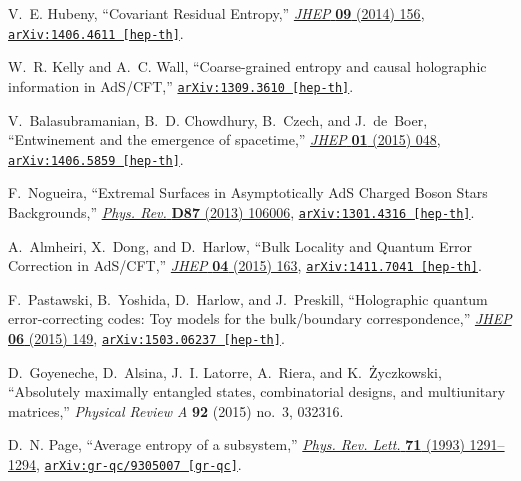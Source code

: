 \begin{thebibliography}{100}
V.~E. Hubeny, ``{Covariant Residual Entropy},''
  \href{http://dx.doi.org/10.1007/JHEP09(2014)156}{{\em JHEP} {\bf 09} (2014)
  156},
\href{http://arxiv.org/abs/1406.4611}{{\tt arXiv:1406.4611 [hep-th]}}.

W.~R. Kelly and A.~C. Wall, ``{Coarse-grained entropy and causal holographic
  information in AdS/CFT},''
\href{http://arxiv.org/abs/1309.3610}{{\tt arXiv:1309.3610 [hep-th]}}.

V.~Balasubramanian, B.~D. Chowdhury, B.~Czech, and J.~de~Boer, ``{Entwinement
  and the emergence of spacetime},''
  \href{http://dx.doi.org/10.1007/JHEP01(2015)048}{{\em JHEP} {\bf 01} (2015)
  048},
\href{http://arxiv.org/abs/1406.5859}{{\tt arXiv:1406.5859 [hep-th]}}.

F.~Nogueira, ``{Extremal Surfaces in Asymptotically AdS Charged Boson Stars
  Backgrounds},'' \href{http://dx.doi.org/10.1103/PhysRevD.87.106006}{{\em
  Phys. Rev.} {\bf D87} (2013)  106006},
\href{http://arxiv.org/abs/1301.4316}{{\tt arXiv:1301.4316 [hep-th]}}.

A.~Almheiri, X.~Dong, and D.~Harlow, ``{Bulk Locality and Quantum Error
  Correction in AdS/CFT},''
  \href{http://dx.doi.org/10.1007/JHEP04(2015)163}{{\em JHEP} {\bf 04} (2015)
  163},
\href{http://arxiv.org/abs/1411.7041}{{\tt arXiv:1411.7041 [hep-th]}}.

F.~Pastawski, B.~Yoshida, D.~Harlow, and J.~Preskill, ``{Holographic quantum
  error-correcting codes: Toy models for the bulk/boundary correspondence},''
  \href{http://dx.doi.org/10.1007/JHEP06(2015)149}{{\em JHEP} {\bf 06} (2015)
  149},
\href{http://arxiv.org/abs/1503.06237}{{\tt arXiv:1503.06237 [hep-th]}}.

D.~Goyeneche, D.~Alsina, J.~I. Latorre, A.~Riera, and K.~{\.Z}yczkowski,
  ``Absolutely maximally entangled states, combinatorial designs, and
  multiunitary matrices,'' {\em Physical Review A} {\bf 92} (2015) no.~3,
  032316.

D.~N. Page, ``{Average entropy of a subsystem},''
  \href{http://dx.doi.org/10.1103/PhysRevLett.71.1291}{{\em Phys. Rev. Lett.}
  {\bf 71} (1993)  1291--1294},
\href{http://arxiv.org/abs/gr-qc/9305007}{{\tt arXiv:gr-qc/9305007 [gr-qc]}}.


\end{thebibliography}

